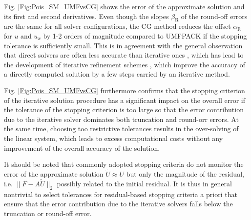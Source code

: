 \documentclass[final,3p]{elsarticle}
\begin{document}
Fig. \ref{Fig:Pois_SM_UMFvsCG} shows the error of the approximate solution and its first and second derivatives. Even though the slopes $\beta _{\text{R}}$ of the round-off errors are the same for all solver configurations, the CG method reduces the offset $\alpha_{\text{R}}$ for $u$ and $u_x$ by 1-2 orders of magnitude compared to UMFPACK if the stopping tolerance is sufficiently small. This is in agreement with the general observation that direct solvers are often less accurate than iterative ones \cite{skeel1980}, which has lead to the development of iterative refinement schemes \citep{wilkinson1963,moler1967,steward1973}, which improve the accuracy of a directly computed solution by a few steps carried by an iterative method.

Fig. \ref{Fig:Pois_SM_UMFvsCG} furthermore confirms that the stopping criterion of the iterative solution procedure has a significant impact on the overall error if the tolerance of the stopping criterion is too large so that the error contribution due to the iterative solver dominates both truncation and round-orr errors. At the same time, choosing too restrictive tolerances results in the over-solving of the linear system, which leads to excess computational costs without any improvement of the overall accuracy of the solution.

It should be noted that commonly adopted stopping criteria do not monitor the error of the approximate solution $\tilde U\approx U$ but only the magnitude of the residual, i.e. $\|F-A\tilde U\|_2$ possibly related to the initial residual. It is thus in general nontrivial to select tolerances for residual-based stopping criteria a priori that ensure that the error contribution due to the iterative solvers falls below the truncation or round-off error.


\end{document}
